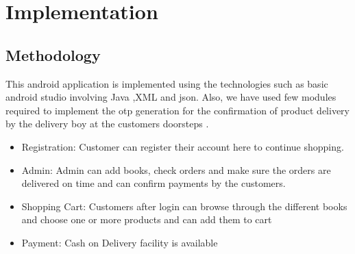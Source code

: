 \chapter{Implementation}
\section{Methodology}
This android application is implemented using the technologies such as basic android studio involving Java ,XML and json. Also, we have used few modules required to implement the otp generation for the confirmation of product delivery by the delivery boy at the customers doorsteps . 
\begin{itemize}
    \item Registration: Customer can register their account here to continue shopping.
    \item Admin: Admin can add books, check orders and make sure the orders are delivered on time and can confirm payments by the customers.
    \item Shopping Cart: Customers after login can browse through the different books and choose one or more products and can add them to cart
    \item Payment: Cash on Delivery facility is available

\end{itemize}





